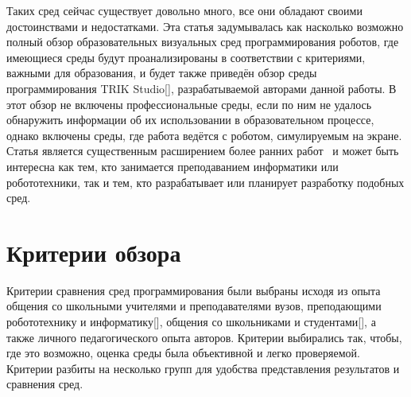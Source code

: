 \documentclass[a5paper]{article}
\begin{document}
Таких сред сейчас существует довольно много, все они обладают своими достоинствами и недостатками. Эта статья 
задумывалась как насколько возможно полный обзор образовательных визуальных сред программирования роботов, 
где имеющиеся среды будут проанализированы в соответствии с критериями, важными для образования, и будет 
также приведён обзор среды программирования TRIK Studio[], разрабатываемой авторами данной работы. В этот 
обзор не включены профессиональные среды, если по ним не удалось обнаружить информации об их 
использовании в образовательном процессе, однако включены среды, где работа ведётся с роботом, симулируемым 
на экране. Статья является существенным расширением более ранних работ~\cite{litvinov2013robots,litvinov2012robots} и
может быть интересна как тем, кто занимается преподаванием информатики или робототехники, 
так и тем, кто разрабатывает или планирует разработку подобных сред.

\section{Критерии обзора}

Критерии сравнения сред программирования были выбраны исходя из опыта общения со школьными учителями и 
преподавателями вузов, преподающими робототехнику и информатику[], общения со школьниками и студентами[], 
а также личного педагогического опыта авторов. Критерии выбирались так, чтобы, где это возможно, оценка 
среды была объективной и легко проверяемой. Критерии разбиты на несколько групп для удобства представления результатов 
и сравнения сред.
\end{document}
